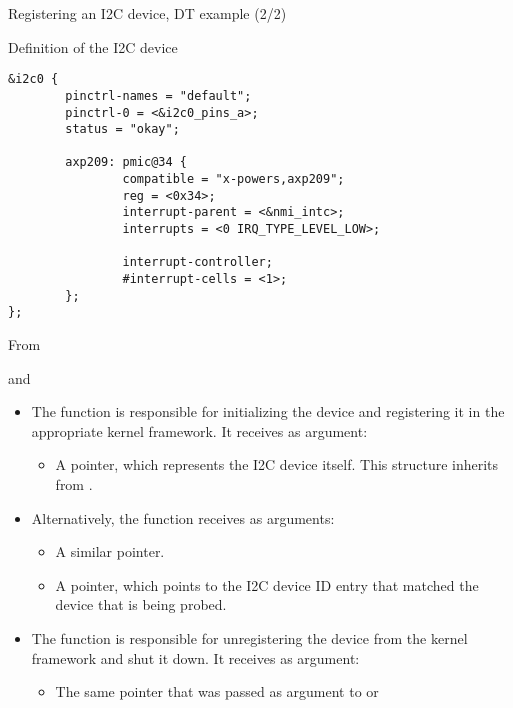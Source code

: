 \begin{frame}[fragile]{Registering an I2C device, DT example (2/2)}
  \begin{block}{Definition of the I2C device}
    \begin{verbatim}
&i2c0 {
        pinctrl-names = "default";
        pinctrl-0 = <&i2c0_pins_a>;
        status = "okay";

        axp209: pmic@34 {
                compatible = "x-powers,axp209";
                reg = <0x34>;
                interrupt-parent = <&nmi_intc>;
                interrupts = <0 IRQ_TYPE_LEVEL_LOW>;

                interrupt-controller;
                #interrupt-cells = <1>;
        };
};
    \end{verbatim}
  \end{block}
  From 
\end{frame}

\begin{frame}{ and }

  \begin{itemize}
  \item The  function is responsible for initializing
    the device and registering it in the appropriate kernel
    framework. It receives as argument:
    \begin{itemize}
    \item A  pointer, which represents the I2C
      device itself. This structure inherits from .
    \end{itemize}
  \item Alternatively, the  function receives as arguments:
    \begin{itemize}
    \item A similar  pointer.
    \item A  pointer, which points to the
      I2C device ID entry that matched the device that is being
      probed.
    \end{itemize}
  \item The  function is responsible for
    unregistering the device from the kernel framework and shut it
    down. It receives as argument:
    \begin{itemize}
    \item The same  pointer that was passed as
      argument to  or 
    \end{itemize}
  \end{itemize}
\end{frame}

